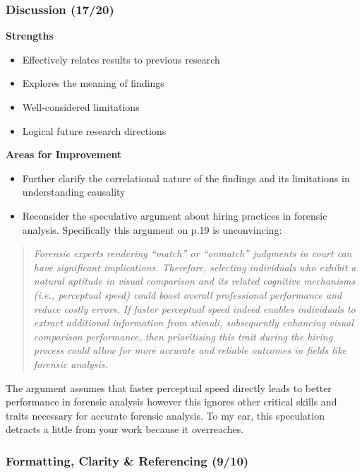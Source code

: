 \documentclass[
  single column]{article}
\providecommand{\tightlist}{%
  \setlength{\itemsep}{0pt}\setlength{\parskip}{0pt}}\usepackage{longtable,booktabs,array}
\begin{document}
\subsubsection{Discussion (17/20)}\label{discussion-1720}

\textbf{Strengths}

\begin{itemize}
\tightlist
\item
  Effectively relates results to previous research
\item
  Explores the meaning of findings
\item
  Well-considered limitations
\item
  Logical future research directions
\end{itemize}

\textbf{Areas for Improvement}

\begin{itemize}
\tightlist
\item
  Further clarify the correlational nature of the findings and its
  limitations in understanding causality
\item
  Reconsider the speculative argument about hiring practices in forensic
  analysis. Specifically this argument on p.19 is unconvincing:
\end{itemize}

\begin{quote}
\emph{Forensic experts rendering ``match'' or ``onmatch'' judgments in
court can have significant implications. Therefore, selecting
individuals who exhibit a natural aptitude in visual comparison and its
related cognitive mechanisms (i.e., perceptual speed) could boost
overall professional performance and reduce costly errors. If faster
perceptual speed indeed enables individuals to extract additional
information from stimuli, subsequently enhancing visual comparison
performance, then prioritising this trait during the hiring process
could allow for more accurate and reliable outcomes in fields like
forensic analysis.}
\end{quote}

The argument assumes that faster perceptual speed directly leads to
better performance in forensic analysis however this ignores other
critical skills and traits necessary for accurate forensic analysis. To
my ear, this speculation detracts a little from your work because it
overreaches.

\subsubsection{Formatting, Clarity \& Referencing
(9/10)}\label{formatting-clarity-referencing-910}
\end{document}
